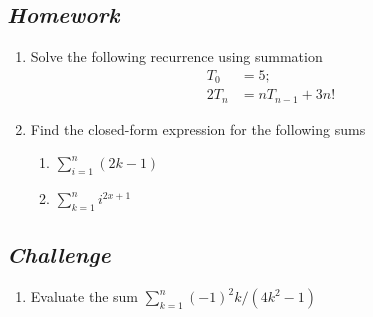 \documentclass[prereq]{cslesson}
\numberwithin{equation}{section}
\begin{document}
\subsection*{\textit{Homework}}
\begin{enumerate}[listparindent=0.7cm, align=left]
\item Solve the following recurrence using summation
\begin{align*}
    T_0&=5;\\
    2T_n&=nT_{n-1}+3n!
\end{align*}
\item Find the closed-form expression for the following sums
\begin{enumerate}[label=(\alph*), listparindent=0.7cm, align=left]
\item $\sum^n_{i=1}(2k-1)$
\item $\sum^n_{k=1}{i^{2x+1}}$
\end{enumerate}
\end{enumerate}

\subsection*{\textit{Challenge}}
\begin{enumerate}[label=(\alph*), listparindent=0.7cm, align=left]
\item Evaluate the sum $\sum^n_{k=1}(-1)^2k/(4k^2-1)$
\end{enumerate}
\end{document}
